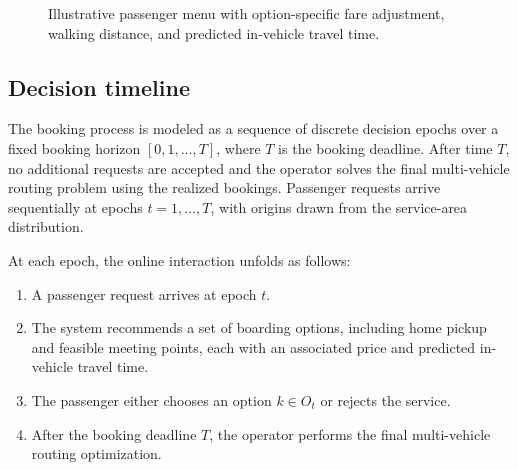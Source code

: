 \documentclass[preprint,12pt,authoryear]{elsarticle}
\begin{document}
\begin{figure}[t]
\centering
\begingroup
\setlength{\fboxsep}{8pt}
\endgroup
\caption{Illustrative passenger menu with option-specific fare adjustment, walking distance, and predicted in-vehicle travel time.}
\label{fig:interface}
\end{figure}

\subsection{Decision timeline}

The booking process is modeled as a sequence of discrete decision epochs over a fixed booking horizon $[0,1,\ldots,T]$, where $T$ is the booking deadline. After time $T$, no additional requests are accepted and the operator solves the final multi-vehicle routing problem using the realized bookings. Passenger requests arrive sequentially at epochs $t=1,\ldots,T$, with origins drawn from the service-area distribution.

At each epoch, the online interaction unfolds as follows:
\begin{enumerate}
\item A passenger request arrives at epoch $t$.
\item The system recommends a set of boarding options, including home pickup and feasible meeting points, each with an associated price and predicted in-vehicle travel time.
\item The passenger either chooses an option $k \in O_t$ or rejects the service.
\item After the booking deadline $T$, the operator performs the final multi-vehicle routing optimization.
\end{enumerate}
\end{document}
